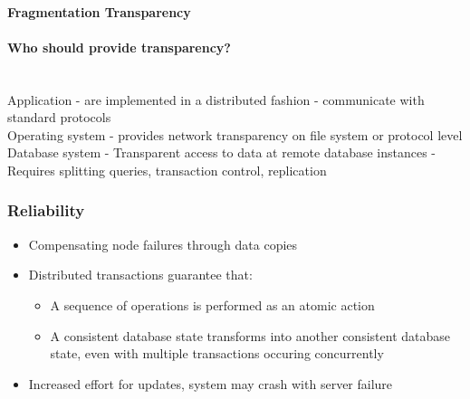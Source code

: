 \documentclass[10pt,a4paper]{article}
\begin{document}
	\paragraph{Fragmentation Transparency}
	
	\paragraph{Who should provide transparency?}	~\\
	Application - are implemented in a distributed fashion	- communicate with standard protocols	\\
	Operating system - provides network transparency on file system or protocol level	\\
	Database system - Transparent access to data at remote database instances - Requires splitting queries, transaction control, replication
	
	\subsubsection{Reliability}
	\begin{itemize}
		\item Compensating node failures through data copies
		\item Distributed transactions guarantee that:
		\begin{itemize}
			\item A sequence of operations is performed as an atomic action
			\item A consistent database state transforms into another consistent database state, even with multiple transactions occuring concurrently
		\end{itemize}
		\item Increased effort for updates, system may crash with server failure
	\end{itemize}
	
\end{document}
